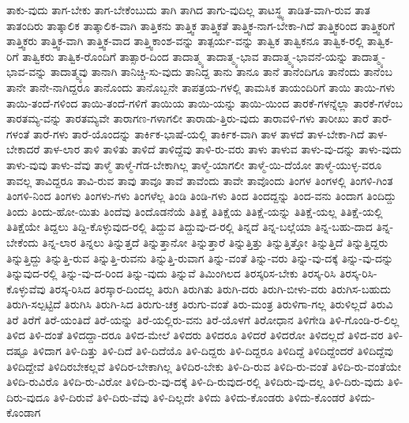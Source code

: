 {ತಾಕು-ವುದು
ತಾಗ-ಬೇಕು
ತಾಗ-ಬೇಕೆಂಬುದು
ತಾಗಿ
ತಾಗಿದ
ತಾಗು-ವುದಿಲ್ಲ
ತಾಟಸ್ಥ್ಯ
ತಾಡಿತ-ವಾಗಿ-ರುವ
ತಾತ
ತಾತಂದಿರು
ತಾತ್ಕಾಲಿಕ
ತಾತ್ಕಾಲಿಕ-ವಾಗಿ
ತಾತ್ತಿಕನು
ತಾತ್ತ್ವಿಕ
ತಾತ್ತ್ವಿಕತೆ
ತಾತ್ತ್ವಿಕ-ನಾಗ-ಬೇಕಾ-ಗಿದೆ
ತಾತ್ತ್ವಿಕರಿಂದ
ತಾತ್ತ್ವಿಕರಿಗೆ
ತಾತ್ತ್ವಿಕರು
ತಾತ್ತ್ವಿಕ-ವಾಗಿ
ತಾತ್ತ್ವಿಕ-ವಾದ
ತಾತ್ತ್ವಿಕಾಂಶ-ವನ್ನು
ತಾತ್ಪರ್ಯ-ವನ್ನು
ತಾತ್ವಿಕ
ತಾತ್ವಿಕನೂ
ತಾತ್ವಿಕ-ರಲ್ಲಿ
ತಾತ್ವಿಕ-ರಿಗೆ
ತಾತ್ವಿಕರು
ತಾತ್ವಿಕ-ರೊಂದಿಗೆ
ತಾತ್ಸಾರ-ದಿಂದ
ತಾದಾತ್ಮ್ಯ
ತಾದಾತ್ಮ್ಯ-ಭಾವ
ತಾದಾತ್ಮ್ಯ-ಭಾವನೆ-ಯನ್ನು
ತಾದಾತ್ಮ್ಯ-ಭಾವ-ವನ್ನು
ತಾದಾತ್ಮ್ಯವು
ತಾನಾಗಿ
ತಾನಿಚ್ಚಿ-ಸು-ವುದು
ತಾನಿದ್ದ
ತಾನು
ತಾನೂ
ತಾನೆ
ತಾನೆಂದಿಗೂ
ತಾನೆಂದು
ತಾನೆಂಬ
ತಾನೇ
ತಾನೇ-ನಾಗಿದ್ದರೂ
ತಾನೊಂದು
ತಾನೊಬ್ಬನೇ
ತಾಪತ್ರಯ-ಗಳಲ್ಲಿ
ತಾಮಸಿಕ
ತಾಯಂದಿರಿಗೆ
ತಾಯಿ
ತಾಯಿ-ಗಳು
ತಾಯಿ-ತಂದೆ-ಗಳಿಂದ
ತಾಯಿ-ತಂದೆ-ಗಳಿಗೆ
ತಾಯಿಯ
ತಾಯಿ-ಯನ್ನು
ತಾಯಿ-ಯಿಂದ
ತಾರಕೆ-ಗಳನ್ನೆಲ್ಲಾ
ತಾರಕೆ-ಗಳೆಂಬ
ತಾರತಮ್ಯ-ವನ್ನು
ತಾರತಮ್ಯವೇ
ತಾರಾಗಣ-ಗಳಾಗಲೀ
ತಾರಾಡು-ತ್ತಿರು-ವುದು
ತಾರಾವಳಿ-ಗಳು
ತಾರೀಖು
ತಾರೆ
ತಾರೆ-ಗಳಂತೆ
ತಾರೆ-ಗಳು
ತಾರೆ-ಯೊಂದನ್ನು
ತಾರ್ಕಿಕ-ಭಾಷೆ-ಯಲ್ಲಿ
ತಾರ್ಕಿಕ-ವಾಗಿ
ತಾಳ
ತಾಳದೆ
ತಾಳ-ಬೇಕಾ-ಗಿದೆ
ತಾಳ-ಬೇಕಾದರೆ
ತಾಳ-ಲಾರ
ತಾಳಿ
ತಾಳಿತು
ತಾಳಿದೆ
ತಾಳಿದ್ದೆವು
ತಾಳಿ-ರು-ವರು
ತಾಳು
ತಾಳುವ
ತಾಳು-ವು-ದನ್ನು
ತಾಳು-ವುದು
ತಾಳು-ವುವು
ತಾಳು-ವೆವು
ತಾಳ್ಮೆ
ತಾಳ್ಮೆ-ಗೆಡ-ಬೇಕಾಗಿಲ್ಲ
ತಾಳ್ಮೆ-ಯಾಗಲೀ
ತಾಳ್ಮೆ-ಯಿ-ದೆಯೋ
ತಾಳ್ಮೆ-ಯುಳ್ಳ-ವರೂ
ತಾವಲ್ಲ
ತಾವಿದ್ದರೂ
ತಾವಿ-ರುವ
ತಾವು
ತಾವೂ
ತಾವೆ
ತಾವೆಂದು
ತಾವೇ
ತಾವೊಂದು
ತಿಂಗಳ
ತಿಂಗಳಲ್ಲಿ
ತಿಂಗಳಿ-ಗಿಂತ
ತಿಂಗಳಿ-ನಿಂದ
ತಿಂಗಳು
ತಿಂಗಳು-ಗಳು
ತಿಂಗಳೆಲ್ಲ
ತಿಂಡಿ
ತಿಂಡಿ-ಗಳು
ತಿಂದ
ತಿಂದದ್ದನ್ನು
ತಿಂದ-ವನು
ತಿಂದಾಗ
ತಿಂದಿದ್ದು
ತಿಂದು
ತಿಂದು-ಹೋ-ಯಿತು
ತಿಂದೆವು
ತಿಂದೊಡನೆಯೆ
ತಿತಿಕ್ಷೆ
ತಿತಿಕ್ಷೆಯ
ತಿತಿಕ್ಷೆ-ಯನ್ನು
ತಿತಿಕ್ಷೆ-ಯಲ್ಲ
ತಿತಿಕ್ಷೆ-ಯಲ್ಲಿ
ತಿತಿಕ್ಷೆಯೇ
ತಿದ್ದಲು
ತಿದ್ದಿ-ಕೊಳ್ಳುವುದ-ರಲ್ಲಿ
ತಿದ್ದುವ
ತಿದ್ದುವು-ದ-ರಲ್ಲಿ
ತಿನ್ನದೆ
ತಿನ್ನ-ಬಲ್ಲೆಯಾ
ತಿನ್ನ-ಬಹು-ದಾದ
ತಿನ್ನ-ಬೇಕೆಂದು
ತಿನ್ನ-ಲಾರ
ತಿನ್ನಲು
ತಿನ್ನುತ್ತದೆ
ತಿನ್ನುತ್ತಾನೋ
ತಿನ್ನುತ್ತಾರೆ
ತಿನ್ನುತ್ತಿತ್ತು
ತಿನ್ನುತ್ತಿತ್ತೋ
ತಿನ್ನುತ್ತಿದೆ
ತಿನ್ನುತ್ತಿದ್ದರು
ತಿನ್ನುತ್ತಿದ್ದು
ತಿನ್ನುತ್ತಿ-ರುವ
ತಿನ್ನುತ್ತಿ-ರುವನು
ತಿನ್ನುತ್ತಿ-ರುವಾಗ
ತಿನ್ನು-ವಂತೆ
ತಿನ್ನು-ವರು
ತಿನ್ನು-ವು-ದಕ್ಕೆ
ತಿನ್ನು-ವು-ದನ್ನು
ತಿನ್ನುವುದ-ರಲ್ಲಿ
ತಿನ್ನು-ವು-ದ-ರಿಂದ
ತಿನ್ನು-ವುದು
ತಿನ್ನುವೆ
ತಿಮಿಂಗಿಲದ
ತಿರಸ್ಕರಿಸ-ಬೇಕು
ತಿರಸ್ಕ-ರಿಸಿ
ತಿರಸ್ಕ-ರಿಸಿ-ಕೊಳ್ಳುವೆವು
ತಿರಸ್ಕ-ರಿಸಿದ
ತಿರಸ್ಕಾರ-ದಿಂದಲ್ಲ
ತಿರುಗಿ
ತಿರುಗಿತು
ತಿರುಗಿ-ದರು
ತಿರುಗಿ-ಬೀಳು-ವರು
ತಿರುಗಿಸ-ಬಹುದು
ತಿರುಗಿ-ಸಲ್ಪಟ್ಟಿದೆ
ತಿರುಗಿಸಿ
ತಿರುಗಿ-ಸಿದ
ತಿರುಗು-ಚಕ್ರ
ತಿರುಗು-ವಂತೆ
ತಿರು-ಮಂತ್ರ
ತಿರುಳಿಗಾ-ಗಲ್ಲ
ತಿರುಳಿಲ್ಲದೆ
ತಿರುವಿ
ತಿರೆ
ತಿರೆಗೆ
ತಿರೆ-ಯಂತಿದೆ
ತಿರೆ-ಯನ್ನು
ತಿರೆ-ಯಲ್ಲಿರು-ವನು
ತಿರೆ-ಯೊಳಗೆ
ತಿರೋಧಾನ
ತಿಳಿಗೇಡಿ
ತಿಳಿ-ಗೊಂಡಿ-ರ-ಲಿಲ್ಲ
ತಿಳಿದ
ತಿಳಿ-ದಂತೆ
ತಿಳಿದದ್ದಾ-ದರೂ
ತಿಳಿದ-ಮೇಲೆ
ತಿಳಿದರು
ತಿಳಿದರೂ
ತಿಳಿದರೆ
ತಿಳಿದರೋ
ತಿಳಿದಲ್ಲದೆ
ತಿಳಿದ-ವರ
ತಿಳಿ-ದಷ್ಟೂ
ತಿಳಿದಾಗ
ತಿಳಿ-ದಿತ್ತು
ತಿಳಿ-ದಿದೆ
ತಿಳಿ-ದಿದೆಯೊ
ತಿಳಿ-ದಿದ್ದರು
ತಿಳಿ-ದಿದ್ದರೂ
ತಿಳಿದಿದ್ದೆ
ತಿಳಿದಿದ್ದೆಂದರೆ
ತಿಳಿದಿದ್ದೆವು
ತಿಳಿದಿದ್ದೇವೆ
ತಿಳಿದಿರಬೇಕಲ್ಲವೆ
ತಿಳಿದಿರ-ಬೇಕಾಗಿಲ್ಲ
ತಿಳಿದಿರ-ಬೇಕು
ತಿಳಿ-ದಿ-ರುವ
ತಿಳಿದಿ-ರು-ವಂತೆ
ತಿಳಿದಿ-ರು-ವಂತೆಯೇ
ತಿಳಿದಿ-ರುವಿರೊ
ತಿಳಿದಿ-ರು-ವಿರೋ
ತಿಳಿದಿ-ರು-ವು-ದಕ್ಕೆ
ತಿಳಿ-ದಿ-ರುವುದ-ರಲ್ಲಿ
ತಿಳಿದಿರು-ವು-ದಲ್ಲ
ತಿಳಿ-ದಿರು-ವುದು
ತಿಳಿ-ದಿರು-ವುದೂ
ತಿಳಿ-ದಿರುವೆ
ತಿಳಿ-ದಿರು-ವೆವು
ತಿಳಿ-ದಿಲ್ಲದೇ
ತಿಳಿದು
ತಿಳಿದು-ಕೊಂಡರು
ತಿಳಿದು-ಕೊಂಡರೆ
ತಿಳಿದು-ಕೊಂಡಾಗ
}
